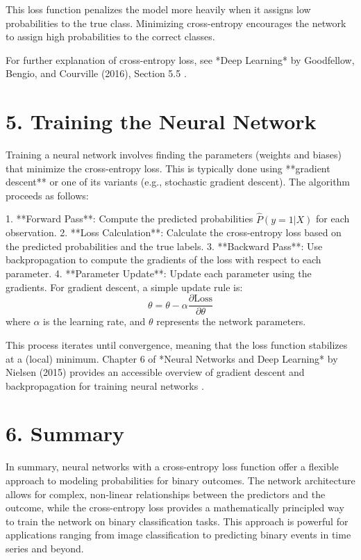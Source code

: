 \documentclass{article}
\begin{document}
This loss function penalizes the model more heavily when it assigns low probabilities to the true class. Minimizing cross-entropy encourages the network to assign high probabilities to the correct classes.

For further explanation of cross-entropy loss, see *Deep Learning* by Goodfellow, Bengio, and Courville (2016), Section 5.5 \cite{goodfellow2016deep}.

\section*{5. Training the Neural Network}

Training a neural network involves finding the parameters (weights and biases) that minimize the cross-entropy loss. This is typically done using **gradient descent** or one of its variants (e.g., stochastic gradient descent). The algorithm proceeds as follows:

1. **Forward Pass**: Compute the predicted probabilities \( \hat{P}(y=1 | X) \) for each observation.
2. **Loss Calculation**: Calculate the cross-entropy loss based on the predicted probabilities and the true labels.
3. **Backward Pass**: Use backpropagation to compute the gradients of the loss with respect to each parameter.
4. **Parameter Update**: Update each parameter using the gradients. For gradient descent, a simple update rule is:
   \[
   \theta = \theta - \alpha \frac{\partial \text{Loss}}{\partial \theta}
   \]
   where \( \alpha \) is the learning rate, and \( \theta \) represents the network parameters.

This process iterates until convergence, meaning that the loss function stabilizes at a (local) minimum. Chapter 6 of *Neural Networks and Deep Learning* by Nielsen (2015) provides an accessible overview of gradient descent and backpropagation for training neural networks \cite{nielsen2015neural}.

\section*{6. Summary}

In summary, neural networks with a cross-entropy loss function offer a flexible approach to modeling probabilities for binary outcomes. The network architecture allows for complex, non-linear relationships between the predictors and the outcome, while the cross-entropy loss provides a mathematically principled way to train the network on binary classification tasks. This approach is powerful for applications ranging from image classification to predicting binary events in time series and beyond.
\end{document}
